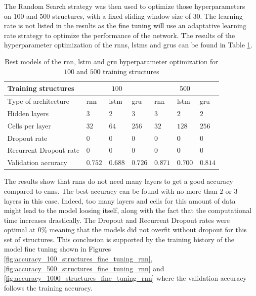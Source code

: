 \documentclass[conference]{IEEEtran}
\begin{document}
The Random Search strategy was then used to optimize those hyperparameters on $ 100 $ and $ 500 $ structures, with a fixed sliding window size of $ 30 $. The learning rate is not listed in the results as the fine tuning will use an adaptative learning rate strategy to optimize the performance of the network. The results of the hyperparameter optimization of the \glspl{rnn}, \glspl{lstm} and \glspl{gru} can be found in Table \ref{tab:results_parameters_rnn_optimization}.

\begin{table}[htp]
	\centering
	\caption{Best models of the \gls{rnn}, \gls{lstm} and \gls{gru} hyperparameter optimization for $ 100 $ and $ 500 $ training structures}
	\label{tab:results_parameters_rnn_optimization}
	\setlength{\tabcolsep}{3pt} %
	\begin{tabular}{p{2.5cm}|lll|lll}
		Training structures & \multicolumn{3}{c}{$ 100 $} & \multicolumn{3}{c}{$ 500 $} \\
		\hline
		Type of architecture & \gls{rnn} & \gls{lstm} & \gls{gru} & \gls{rnn} & \gls{lstm} & \gls{gru}\\
		\hline
		Hidden layers & $3$ & $2$ & $3$ & $3$ & $2$ & $2$ \\
		Cells per layer & $32$ & $64$ & $256$ & $32$ & $128$ & $256$ \\
		Dropout rate & $0$ & $0$ & $0$ & $0$ & $0$ & $0$ \\
		Recurrent Dropout rate & $0$ & $0$ & $0$& $0$ & $0$ & $0$ \\
		\hline
		Validation accuracy & $0.752$ & $0.688$ & $0.726$ & $0.871$ & $0.700$ & $0.814$
	\end{tabular}
\end{table}

The results show that \glspl{rnn} do not need many layers to get a good accuracy compared to \glspl{cnn}. The best accuracy can be found with no more than $ 2 $ or $ 3 $ layers in this case. Indeed, too many layers and cells for this amount of data might lead to the model loosing itself, along with the fact that the computational time increases drastically. The Dropout and Recurrent Dropout rates were optimal at $ 0 \% $ meaning that the models did not overfit without dropout for this set of structures. This conclusion is supported by the training history of the model fine tuning shown in Figures \ref{fig:accuracy_100_structures_fine_tuning_rnn}, \ref{fig:accuracy_500_structures_fine_tuning_rnn} and \ref{fig:accuracy_1000_structures_fine_tuning_rnn} where the validation accuracy follows the training accuracy.
\end{document}
